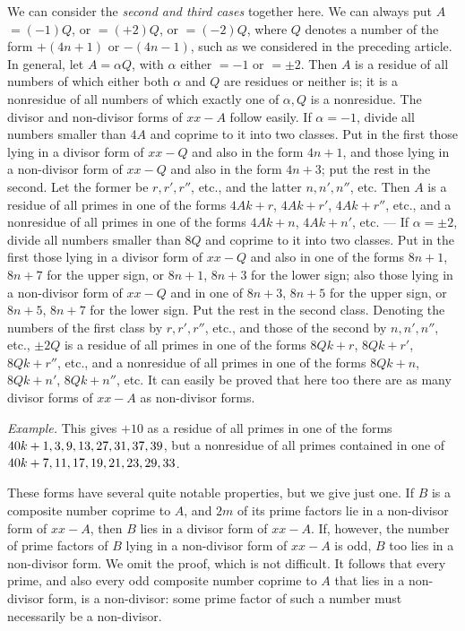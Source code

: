 We can consider the \textit{second and third cases} together here. We can always put $A$ $=(-1)Q$, or $=(+2)Q$, or $=(-2)Q$, where $Q$ denotes a number of the form $+(4n+1)$ or $-(4n-1)$, such as we considered in the preceding article. In general, let $A=\alpha Q$, with $\alpha$ either $=-1$ or $=\pm2$. Then $A$ is a residue of all numbers of which either both $\alpha$ and $Q$ are residues or neither is; it is a nonresidue of all numbers of which exactly one of $\alpha,Q$ is a nonresidue. The divisor and non-divisor forms of $xx-A$ follow easily. If $\alpha=-1$, divide all numbers smaller than $4A$ and coprime to it into two classes. Put in the first those lying in a divisor form of $xx-Q$ and also in the form $4n+1$, and those lying in a non-divisor form of $xx-Q$ and also in the form $4n+3$; put the rest in the second. Let the former be $r,r',r''$, etc., and the latter $n,n',n''$, etc. Then $A$ is a residue of all primes in one of the forms $4Ak+r$, $4Ak+r'$, $4Ak+r''$, etc., and a nonresidue of all primes in one of the forms $4Ak+n$, $4Ak+n'$, etc. --- If $\alpha=\pm2$, divide all numbers smaller than $8Q$ and coprime to it into two classes. Put in the first those lying in a divisor form of $xx-Q$ and also in one of the forms $8n+1$, $8n+7$ for the upper sign, or $8n+1$, $8n+3$ for the lower sign; also those lying in a non-divisor form of $xx-Q$ and in one of $8n+3$, $8n+5$ for the upper sign, or $8n+5$, $8n+7$ for the lower sign. Put the rest in the second class. Denoting the numbers of the first class by $r,r',r''$, etc., and those of the second by $n,n',n''$, etc., $\pm2Q$ is a residue of all primes in one of the forms $8Qk+r$, $8Qk+r'$, $8Qk+r''$, etc., and a nonresidue of all primes in one of the forms $8Qk+n$, $8Qk+n'$, $8Qk+n''$, etc. It can easily be proved that here too there are as many divisor forms of $xx-A$ as non-divisor forms.

\textit{Example.} This gives $+10$ as a residue of all primes in one of the forms $40k+\nobreak{}1,\allowbreak{}3,\allowbreak{}9,\allowbreak{}13,\allowbreak{}27,\allowbreak{}31,\allowbreak{}37,\allowbreak{}39$, but a nonresidue of all primes contained in one of $40k+\nobreak{}7,\allowbreak{}11,\allowbreak{}17,\allowbreak{}19,\allowbreak{}21,\allowbreak{}23,\allowbreak{}29,\allowbreak{}33$.

These forms have several quite notable properties, but we give just one. If $B$ is a composite number coprime to $A$, and $2m$ of its prime factors lie in a non-divisor form of $xx-A$, then $B$ lies in a divisor form of $xx-A$. If, however, the number of prime factors of $B$ lying in a non-divisor form of $xx-A$ is odd, $B$ too lies in a non-divisor form. We omit the proof, which is not difficult. It follows that every prime, and also every odd composite number coprime to $A$ that lies in a non-divisor form, is a non-divisor: some prime factor of such a number must necessarily be a non-divisor.

